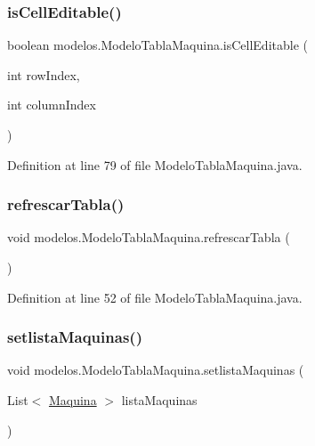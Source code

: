 \subsubsection{\texorpdfstring{is\+Cell\+Editable()}{isCellEditable()}}
{\footnotesize\ttfamily boolean modelos.\+Modelo\+Tabla\+Maquina.\+is\+Cell\+Editable (\begin{DoxyParamCaption}\item[{int}]{row\+Index,  }\item[{int}]{column\+Index }\end{DoxyParamCaption})}



Definition at line 79 of file Modelo\+Tabla\+Maquina.\+java.

\mbox{\label{classmodelos_1_1_modelo_tabla_maquina_a48d1751bbb3bfb91d50eb5bd2a80207e}} 
\subsubsection{\texorpdfstring{refrescar\+Tabla()}{refrescarTabla()}}
{\footnotesize\ttfamily void modelos.\+Modelo\+Tabla\+Maquina.\+refrescar\+Tabla (\begin{DoxyParamCaption}{ }\end{DoxyParamCaption})}



Definition at line 52 of file Modelo\+Tabla\+Maquina.\+java.

\mbox{\label{classmodelos_1_1_modelo_tabla_maquina_a559a21bd653aa7b639fa598ff22fa5f7}} 
\subsubsection{\texorpdfstring{setlista\+Maquinas()}{setlistaMaquinas()}}
{\footnotesize\ttfamily void modelos.\+Modelo\+Tabla\+Maquina.\+setlista\+Maquinas (\begin{DoxyParamCaption}\item[{List$<$ \mbox{\hyperlink{classobjetos_1_1_maquina}{Maquina}} $>$}]{lista\+Maquinas }\end{DoxyParamCaption})}



